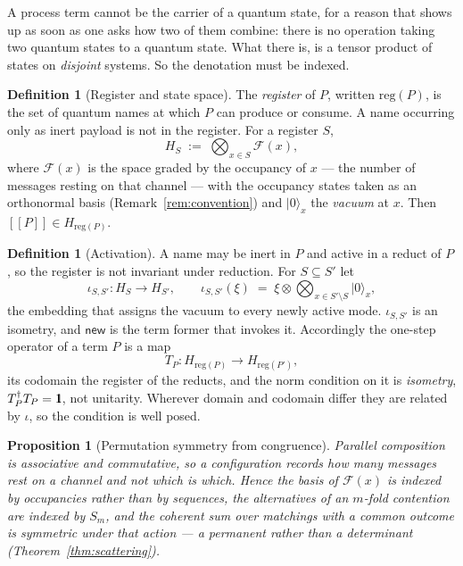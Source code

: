 \documentclass[11pt,a4paper]{article}
\newcommand{\Id}{\mathrm{1}\hspace{-0.30em}\mathrm{l}}
\theoremstyle{plain}
\newtheorem{proposition}[theorem]{Proposition}
\theoremstyle{definition}
\newtheorem{definition}[theorem]{Definition}
\theoremstyle{remark}
\newcommand{\sem}[1]{[\![#1]\!]}
\newcommand{\ket}[1]{\lvert #1 \rangle}
\begin{document}
A process term cannot be the carrier of a quantum state, for a reason that shows
up as soon as one asks how two of them combine: there is no operation taking two
quantum states to a quantum state. What there is, is a tensor product of states
on \emph{disjoint} systems. So the denotation must be indexed.

\begin{definition}[Register and state space]\label{def:register}
The \emph{register} of $P$, written $\mathrm{reg}(P)$, is the set of quantum
names at which $P$ can produce or consume. A name occurring only as inert
payload is not in the register. For a register $S$,
\[
  H_S \;:=\; \bigotimes_{x \in S} \mathcal{F}(x),
\]
where $\mathcal{F}(x)$ is the space graded by the occupancy of $x$ --- the
number of messages resting on that channel --- with the occupancy states taken
as an orthonormal basis (Remark~\ref{rem:convention}) and $\ket{0}_x$ the
\emph{vacuum} at $x$. Then $\sem{P} \in H_{\mathrm{reg}(P)}$.
\end{definition}

\begin{definition}[Activation]\label{def:activate}
A name may be inert in $P$ and active in a reduct of $P$, so the register is not
invariant under reduction. For $S \subseteq S'$ let
\[
  \iota_{S,S'} : H_S \longrightarrow H_{S'},
  \qquad
  \iota_{S,S'}(\xi) \;=\; \xi \otimes \bigotimes_{x \in S'\setminus S}\ket{0}_x ,
\]
the embedding that assigns the vacuum to every newly active mode.
$\iota_{S,S'}$ is an isometry, and $\textsf{new}$ is the term former that
invokes it. Accordingly the one-step operator of a term $P$ is a map
\[
  T_P : H_{\mathrm{reg}(P)} \longrightarrow H_{\mathrm{reg}(P')},
\]
its codomain the register of the reducts, and the norm condition on it is
\emph{isometry}, $T_P^{\dagger}T_P = \Id$, not unitarity. Wherever domain and
codomain differ they are related by $\iota$, so the condition is well posed.
\end{definition}

\begin{proposition}[Permutation symmetry from congruence]\label{prop:bose}
Parallel composition is associative and commutative, so a configuration records
how many messages rest on a channel and not which is which. Hence the basis of
$\mathcal{F}(x)$ is indexed by occupancies rather than by sequences, the
alternatives of an $m$-fold contention are indexed by $S_m$, and the coherent
sum over matchings with a common outcome is symmetric under that action --- a
permanent rather than a determinant (Theorem~\ref{thm:scattering}).
\end{proposition}
\end{document}
